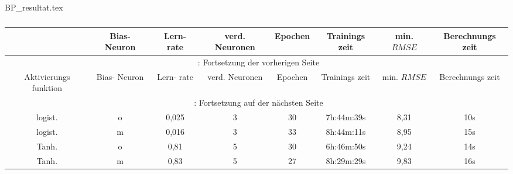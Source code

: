 \begin{filecontents*}{BP_resultat.tex}
{
\captionsetup{skip=1pt,margin=5pt,position=below} %

\begin{longtable}{cccccccc}
    \caption{} \label{tab:BP_resultat}\\
    \toprule
    \hiderowcolors

       \multicolumn{1}{Y}{Aktivierungs funktion} &      \multicolumn{1}{Y}{Bias- Neuron} &   \multicolumn{1}{Y}{Lern- rate} &  \multicolumn{1}{Y}{verd. Neuronen} &  \multicolumn{1}{Y}{Epochen} &  \multicolumn{1}{Y}{Trainings zeit} & \multicolumn{1}{Y}{min. $RMSE$}  & \multicolumn{1}{Y}{Berechnungs zeit} \\

    \midrule
    \endfirsthead
        \multicolumn{8}{c}{\footnotesize \tablename\ \thetable{}: Fortsetzung der vorherigen Seite} \\
    \toprule
       \multicolumn{1}{Y}{Aktivierungs funktion} &      \multicolumn{1}{Y}{Bias- Neuron} &   \multicolumn{1}{Y}{Lern- rate} &  \multicolumn{1}{Y}{verd. Neuronen} &  \multicolumn{1}{Y}{Epochen} &  \multicolumn{1}{Y}{Trainings zeit} & \multicolumn{1}{Y}{min. $RMSE$}  & \multicolumn{1}{Y}{Berechnungs zeit} \\
    \midrule
    \endhead
    \midrule
        \multicolumn{8}{c}{{\footnotesize \tablename\ \thetable{}: Fortsetzung auf der nächsten Seite}} \\
    \bottomrule
    \endfoot
    \bottomrule

        
    \endlastfoot
    \showrowcolors
        logist.                 & o       & 0,025 & 3         & 30  & 7h:44m:39s & 8,31 & 10s         \\
        logist.                 & m       & 0,016 & 3         & 33  & 8h:44m:11s & 8,95 & 15s         \\
        Tanh.                   & o       & 0,81  & 5         & 30  & 6h:46m:50s & 9,24 & 14s         \\
        Tanh.                   & m       & 0,83  & 5         & 27  & 8h:29m:29s & 9,83 & 16s         \\

        
\end{longtable}

}
\end{filecontents*}

